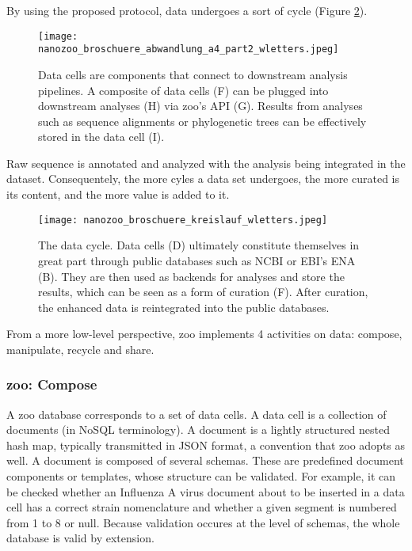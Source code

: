 By using the proposed protocol, data undergoes a sort of cycle (Figure \ref{fig:circle}).


\begin{figure}[H]
    \begin{center}\texttt{[image: nanozoo\_broschuere\_abwandlung\_a4\_part2\_wletters.jpeg]}\end{center}
    \caption[Infographic: Data cells are components that connect to downstream analysis pipelines.]{Data cells are components that connect to downstream analysis pipelines. A composite of data cells (F) can be plugged into downstream analyses (H) via zoo's API (G). Results from analyses such as sequence alignments or phylogenetic trees can be effectively stored in the data cell (I).}
    \label{fig:nz2}
\end{figure}


Raw sequence is annotated and analyzed with the analysis being integrated in the dataset. Consequentely, the more cyles a data set undergoes, the more curated is its content, and the more value is added to it.


\begin{figure}[H]
    \begin{center}\texttt{[image: nanozoo\_broschuere\_kreislauf\_wletters.jpeg]}\end{center}
    \caption[The data cycle.]{The data cycle. Data cells (D) ultimately constitute themselves in great part through public databases such as NCBI or EBI's ENA (B). They are then used as backends for analyses and store the results, which can be seen as a form of curation (F). After curation, the enhanced data is reintegrated into the public databases.}
    \label{fig:circle}
\end{figure}


From a more low-level perspective, zoo implements 4 activities on data: compose, manipulate, recycle and share.


\subsubsection{zoo: Compose}

A zoo database corresponds to a set of data cells. A data cell is a collection of documents (in NoSQL terminology). A document is a lightly structured nested hash map, typically transmitted in JSON format, a convention that zoo adopts as well. A document is composed of several schemas. These are predefined document components or templates, whose structure can be validated. For example, it can be checked whether an Influenza A virus document about to be inserted in a data cell has a correct strain nomenclature and whether a given segment is numbered from 1 to 8 or null. Because validation occures at the level of schemas, the whole database is valid by extension.

